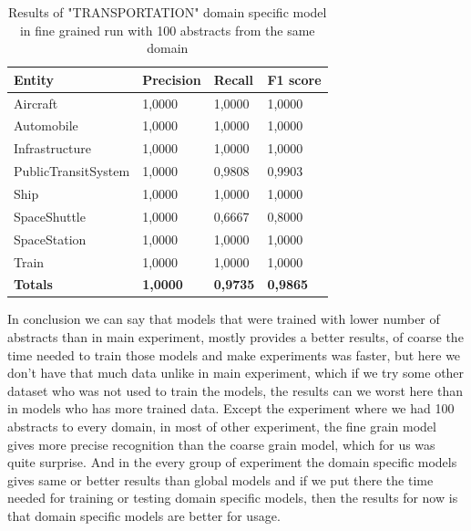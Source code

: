 \documentclass[thesis=M,english]{FITthesis}[2018/05/30]
\begin{document}
	\begin{table}[H]\centering
		\begin{tabular}{|l|l|l|l|}
			\hline {\textbf{Entity}} & {\textbf{Precision}} & {\textbf{Recall}} & {\textbf{F1 score}}\\\hline
				Aircraft & 1,0000 & 1,0000 & 1,0000\\
				Automobile & 1,0000 & 1,0000 & 1,0000\\				
				Infrastructure & 1,0000 & 1,0000 & 1,0000\\
				PublicTransitSystem & 1,0000 & 0,9808 & 0,9903\\
				Ship & 1,0000 & 1,0000 & 1,0000\\				
				SpaceShuttle & 1,0000 & 0,6667 & 0,8000\\
				SpaceStation & 1,0000 & 1,0000 & 1,0000\\
				Train & 1,0000 & 1,0000 & 1,0000\\\hline
				\textbf{Totals} & \textbf{1,0000} & \textbf{0,9735} & \textbf{0,9865}\\\hline
		\end{tabular}
		\caption{Results of "TRANSPORTATION" domain specific model in fine grained run with 100 abstracts from the same domain \label{table:100TransportationDomainWithTransportationTop100Fine}}
	\end{table}	


In conclusion we can say that models that were trained with lower number of abstracts than in main experiment, mostly provides a better results, of coarse the time needed to train those models and make experiments was faster, but here we don't have that much data unlike in main experiment, which if we try some other dataset who was not used to train the models, the results can we worst here than in models who has more trained data. Except the experiment where we had 100 abstracts to every domain, in most of other experiment, the fine grain model gives more precise recognition than the coarse grain model, which for us was quite surprise. And in the every group of experiment the domain specific models gives same or better results than global models and if we put there the time needed for training or testing domain specific models, then the results for now is that domain specific models are better for usage. 
\end{document}

